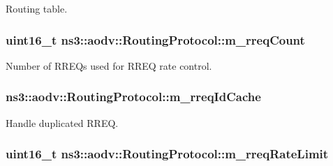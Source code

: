 Routing table. 

\subsubsection[{\texorpdfstring{m\+\_\+rreq\+Count}{m_rreqCount}}]{\setlength{\rightskip}{0pt plus 5cm}uint16\+\_\+t ns3\+::aodv\+::\+Routing\+Protocol\+::m\+\_\+rreq\+Count\hspace{0.3cm}{\ttfamily [private]}}\hypertarget{classns3_1_1aodv_1_1RoutingProtocol_a942f693d81f870c9ed9f155effae9577}{}\label{classns3_1_1aodv_1_1RoutingProtocol_a942f693d81f870c9ed9f155effae9577}


Number of R\+R\+E\+Qs used for R\+R\+EQ rate control. 

\subsubsection[{\texorpdfstring{m\+\_\+rreq\+Id\+Cache}{m_rreqIdCache}}]{ ns3\+::aodv\+::\+Routing\+Protocol\+::m\+\_\+rreq\+Id\+Cache\hspace{0.3cm}{\ttfamily [private]}}\hypertarget{classns3_1_1aodv_1_1RoutingProtocol_a96743ff957b0a878c23e55a84e209d5d}{}\label{classns3_1_1aodv_1_1RoutingProtocol_a96743ff957b0a878c23e55a84e209d5d}


Handle duplicated R\+R\+EQ. 

\subsubsection[{\texorpdfstring{m\+\_\+rreq\+Rate\+Limit}{m_rreqRateLimit}}]{\setlength{\rightskip}{0pt plus 5cm}uint16\+\_\+t ns3\+::aodv\+::\+Routing\+Protocol\+::m\+\_\+rreq\+Rate\+Limit\hspace{0.3cm}{\ttfamily [private]}}\hypertarget{classns3_1_1aodv_1_1RoutingProtocol_a543abca2b224dcde1362f1050f1887c7}{}\label{classns3_1_1aodv_1_1RoutingProtocol_a543abca2b224dcde1362f1050f1887c7}


